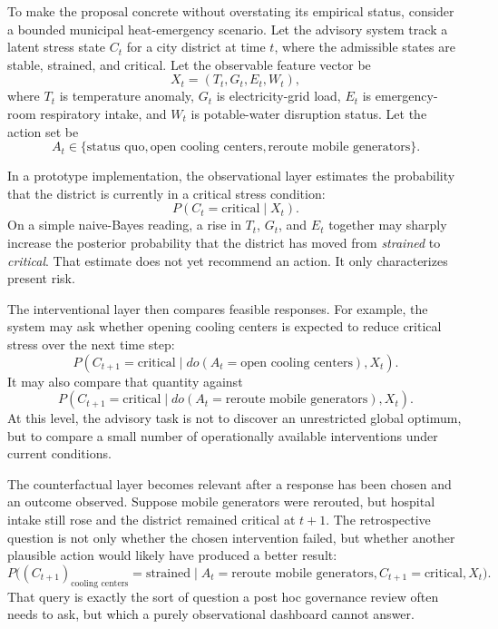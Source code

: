 \documentclass[11pt]{article}
\begin{document}
To make the proposal concrete without overstating its empirical status, consider a bounded municipal heat-emergency scenario. Let the advisory system track a latent stress state $C_t$ for a city district at time $t$, where the admissible states are stable, strained, and critical. Let the observable feature vector be
\begin{equation}
X_t = (T_t, G_t, E_t, W_t),
\end{equation}
where $T_t$ is temperature anomaly, $G_t$ is electricity-grid load, $E_t$ is emergency-room respiratory intake, and $W_t$ is potable-water disruption status. Let the action set be
\begin{equation}
A_t \in \{\text{status quo}, \text{open cooling centers}, \text{reroute mobile generators}\}.
\end{equation}

In a prototype implementation, the observational layer estimates the probability that the district is currently in a critical stress condition:
\begin{equation}
P(C_t = \text{critical} \mid X_t).
\end{equation}
On a simple naive-Bayes reading, a rise in $T_t$, $G_t$, and $E_t$ together may sharply increase the posterior probability that the district has moved from \textit{strained} to \textit{critical}. That estimate does not yet recommend an action. It only characterizes present risk.

The interventional layer then compares feasible responses. For example, the system may ask whether opening cooling centers is expected to reduce critical stress over the next time step:
\begin{equation}
P(C_{t+1} = \text{critical} \mid do(A_t=\text{open cooling centers}), X_t).
\end{equation}
It may also compare that quantity against
\begin{equation}
P(C_{t+1} = \text{critical} \mid do(A_t=\text{reroute mobile generators}), X_t).
\end{equation}
At this level, the advisory task is not to discover an unrestricted global optimum, but to compare a small number of operationally available interventions under current conditions.

The counterfactual layer becomes relevant after a response has been chosen and an outcome observed. Suppose mobile generators were rerouted, but hospital intake still rose and the district remained critical at $t+1$. The retrospective question is not only whether the chosen intervention failed, but whether another plausible action would likely have produced a better result:
\begin{equation}
P\bigl((C_{t+1})_{\text{cooling centers}} = \text{strained} \mid A_t=\text{reroute mobile generators}, C_{t+1}=\text{critical}, X_t\bigr).
\end{equation}
That query is exactly the sort of question a post hoc governance review often needs to ask, but which a purely observational dashboard cannot answer.
\end{document}
